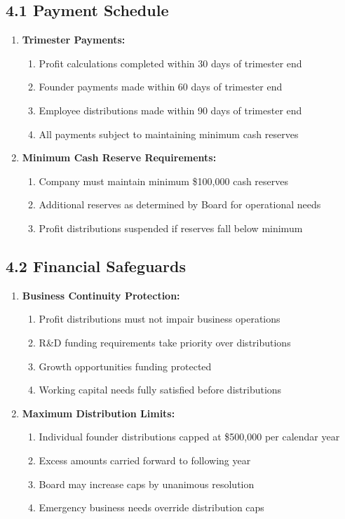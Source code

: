 \subsection*{4.1 Payment Schedule}
\begin{enumerate}[label=\arabic*.]
\item \textbf{Trimester Payments:}
    \begin{enumerate}[label=(\alph*)]
    \item Profit calculations completed within 30 days of trimester end
    \item Founder payments made within 60 days of trimester end
    \item Employee distributions made within 90 days of trimester end
    \item All payments subject to maintaining minimum cash reserves
    \end{enumerate}

\item \textbf{Minimum Cash Reserve Requirements:}
    \begin{enumerate}[label=(\alph*)]
    \item Company must maintain minimum \$100,000 cash reserves
    \item Additional reserves as determined by Board for operational needs
    \item Profit distributions suspended if reserves fall below minimum
    \end{enumerate}
\end{enumerate}

\subsection*{4.2 Financial Safeguards}
\begin{enumerate}[label=\arabic*.]
\item \textbf{Business Continuity Protection:}
    \begin{enumerate}[label=(\alph*)]
    \item Profit distributions must not impair business operations
    \item R\&D funding requirements take priority over distributions
    \item Growth opportunities funding protected
    \item Working capital needs fully satisfied before distributions
    \end{enumerate}

\item \textbf{Maximum Distribution Limits:}
    \begin{enumerate}[label=(\alph*)]
    \item Individual founder distributions capped at \$500,000 per calendar year
    \item Excess amounts carried forward to following year
    \item Board may increase caps by unanimous resolution
    \item Emergency business needs override distribution caps
    \end{enumerate}
\end{enumerate}

